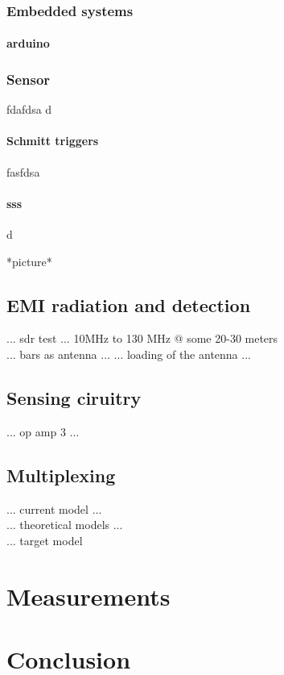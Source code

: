 \documentclass[11pt]{article} %
\begin{document}
\subsubsection{Embedded systems}
\paragraph{arduino}
\subsubsection{Sensor}
fdafdsa
d
\paragraph{Schmitt triggers}
\medskip
fasfdsa
\paragraph{sss}
d

*picture*


\subsection{EMI radiation and detection}
... sdr test ... 10MHz to 130 MHz @ some 20-30 meters
\\
... bars as antenna ...
... loading of the antenna ...
\subsection{Sensing ciruitry}
... op amp 3 ...
\subsection{Multiplexing}
... current model ...
\\
... theoretical models ...
\\
... target model

\section{Measurements}
\section{Conclusion}
\end{document}
